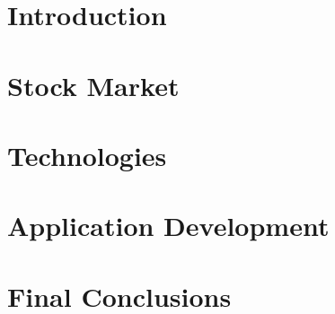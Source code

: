 \documentclass[a4paper, 12pt]{report}
\begin{document}





\tableofcontents

\listoffigures


\chapter{Introduction}


\chapter{Stock Market}


\chapter{Technologies}


\chapter{Application Development}


\chapter{Final Conclusions}




\printbibliography[heading=bibintoc, title={Bibliography}]
\end{document}
